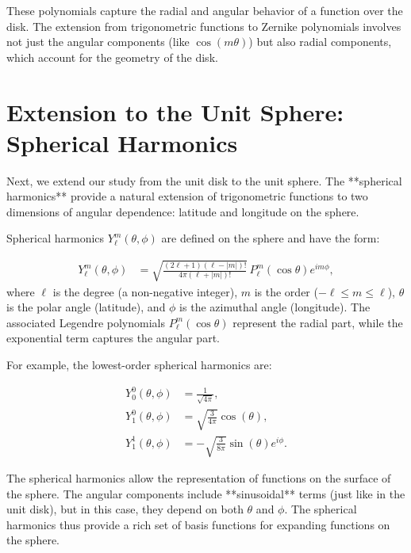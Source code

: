 These polynomials capture the radial and angular behavior of a function over the disk. The extension from trigonometric functions to Zernike polynomials involves not just the angular components (like \(\cos(m\theta)\)) but also radial components, which account for the geometry of the disk.

\section{Extension to the Unit Sphere: Spherical Harmonics}

Next, we extend our study from the unit disk to the unit sphere. The **spherical harmonics** provide a natural extension of trigonometric functions to two dimensions of angular dependence: latitude and longitude on the sphere.

Spherical harmonics \(Y_{\ell}^{m}(\theta, \phi)\) are defined on the sphere and have the form:

\begin{equation}
\begin{split}
Y_{\ell}^{m}(\theta, \phi) &= \sqrt{\frac{(2\ell + 1)(\ell - |m|)!}{4\pi (\ell + |m|)!}} \, P_{\ell}^{m}(\cos\theta) e^{im\phi},
\end{split}
\end{equation}
where \(\ell\) is the degree (a non-negative integer), \(m\) is the order (\(-\ell \leq m \leq \ell\)), \(\theta\) is the polar angle (latitude), and \(\phi\) is the azimuthal angle (longitude). The associated Legendre polynomials \(P_{\ell}^{m}(\cos\theta)\) represent the radial part, while the exponential term captures the angular part.

For example, the lowest-order spherical harmonics are:

\begin{equation}
\begin{split}
Y_0^0(\theta, \phi) &= \frac{1}{\sqrt{4\pi}}, \\
Y_1^0(\theta, \phi) &= \sqrt{\frac{3}{4\pi}} \cos(\theta), \\
Y_1^1(\theta, \phi) &= -\sqrt{\frac{3}{8\pi}} \sin(\theta) e^{i\phi}.
\end{split}
\end{equation}

The spherical harmonics allow the representation of functions on the surface of the sphere. The angular components include **sinusoidal** terms (just like in the unit disk), but in this case, they depend on both \(\theta\) and \(\phi\). The spherical harmonics thus provide a rich set of basis functions for expanding functions on the sphere.

